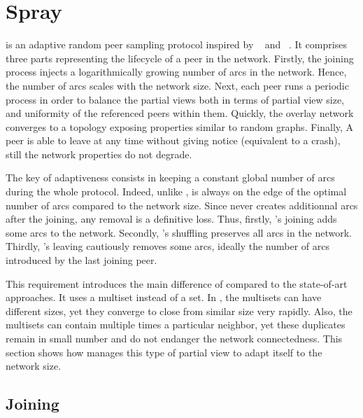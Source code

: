
\section{Spray}
\label{sec:proposal}

\SPRAY is an adaptive random peer sampling protocol inspired by
\SCAMP~\cite{ganesh2003peer} and \CYCLON~\cite{voulgaris2005cyclon}. It
comprises three parts representing the lifecycle of a peer in the network.
Firstly, the joining process injects a logarithmically growing number of arcs
in the network. Hence, the number of arcs scales with the network size.  Next,
each peer runs a periodic process in order to balance the partial views both in
terms of partial view size, and uniformity of the referenced peers within
them. Quickly, the overlay network converges to a topology exposing properties
similar to random graphs. Finally, A peer is able to leave at any time without
giving notice (equivalent to a crash), still the network properties do not
degrade.

The key of adaptiveness consists in keeping a constant global number of arcs
during the whole protocol. Indeed, unlike \CYCLON, \SPRAY is always on the edge
of the optimal number of arcs compared to the network size. Since \SPRAY never
creates additionnal arcs after the joining, any removal is a definitive
loss. Thus, firstly, \SPRAY's joining adds some arcs to the network. Secondly,
\SPRAY's shuffling preserves all arcs in the network. Thirdly, \SPRAY's leaving
cautiously removes some arcs, ideally the number of arcs introduced by the last
joining peer.

This requirement introduces the main difference of \SPRAY compared to the
state-of-art approaches. It uses a multiset instead of a set. In \SPRAY, the
multisets can have different sizes, yet they converge to close from similar
size very rapidly. Also, the multisets can contain multiple times a particular
neighbor, yet these duplicates remain in small number and do not endanger the
network connectedness. This section shows how \SPRAY manages this type of
partial view to adapt itself to the network size.

\subsection{Joining}


